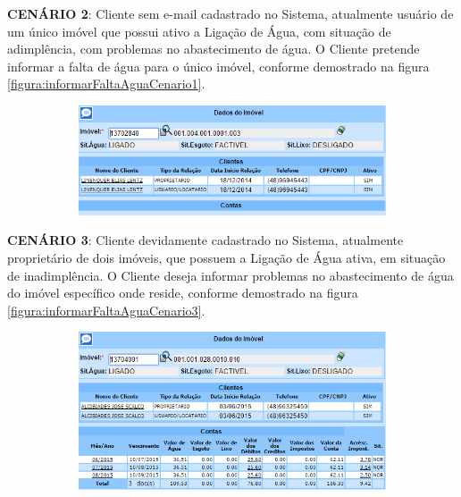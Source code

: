 \begin{flushleft}
	\begin{description}
		\item \textbf{CENÁRIO 2}: Cliente sem e-mail cadastrado no Sistema, atualmente usuário de um único imóvel que possui ativo a Ligação de Água, com situação de adimplência, com problemas no abastecimento de água. O Cliente pretende informar a falta de água para o único imóvel, conforme demostrado na figura \ref{figura:informarFaltaAguaCenario1}.
		\begin{figure}[H]
			\centering
			\caption{\textbf{Informar Falta de Água - Cenário de Teste 2}}
			\label{figura:informarFaltaAguaCenario2}
			\begin{subfigure}[H]{\textwidth}
				\centering
				\includegraphics{figuras/cenarios/informar_falta_agua/cenario_2.PNG}
			\end{subfigure}
		\end{figure}	
	\end{description}
	
	\begin{description}
		\item \textbf{CENÁRIO 3}: Cliente devidamente cadastrado no Sistema, atualmente proprietário de dois imóveis, que possuem a Ligação de Água ativa, em situação de inadimplência. O Cliente deseja informar problemas no abastecimento de água do imóvel específico onde reside, conforme demostrado na figura \ref{figura:informarFaltaAguaCenario3}.
		\begin{figure}[H]
			\centering
			\caption{\textbf{Informar Falta de Água - Cenário de Teste 3}}
			\label{figura:informarFaltaAguaCenario3}
			\begin{subfigure}[H]{\textwidth}
				\centering
				\includegraphics{figuras/cenarios/informar_falta_agua/cenario_3.PNG}
				\legend {\fontsize{10}{12}\selectfont {Fonte: Autoria Própria}.}	
			\end{subfigure}
		\end{figure}
	\end{description}
\end{flushleft}	

